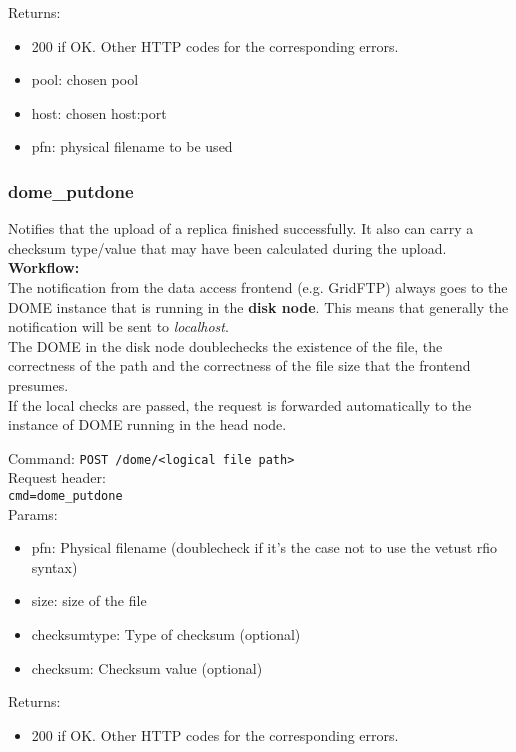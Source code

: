 \documentclass[a4paper,10pt]{scrreprt}
\begin{document}
Returns:
\begin{itemize}
 \item 200 if OK. Other HTTP codes for the corresponding errors.
 \item pool: chosen pool
 \item host: chosen host:port
 \item pfn: physical filename to be used
\end{itemize}

\subsubsection{dome\_putdone}
Notifies that the upload of a replica finished successfully. It also can carry a checksum type/value that may have been calculated during the upload.\\

\textbf{Workflow:}\\
The notification from the data access frontend (e.g. GridFTP) always goes to the DOME instance that is running in the \textbf{disk node}. This means that
generally the notification will be sent to \textit{localhost}.\\
The DOME in the disk node doublechecks the existence of the file, the correctness of the path and the correctness of the file size that
the frontend presumes.\\
If the local checks are passed, the request is forwarded automatically to the instance of DOME running in the head node.

Command:
\lstinline"POST /dome/<logical file path>"\\
Request header:\\
\lstinline"cmd=dome_putdone"\\

Params:
\begin{itemize}
 \item pfn: Physical filename (doublecheck if it's the case not to use the vetust rfio syntax)
 \item size: size of the file
 \item checksumtype: Type of checksum (optional)
 \item checksum: Checksum value (optional)
\end{itemize}

Returns:
\begin{itemize}
 \item 200 if OK. Other HTTP codes for the corresponding errors.
\end{itemize}
\end{document}
